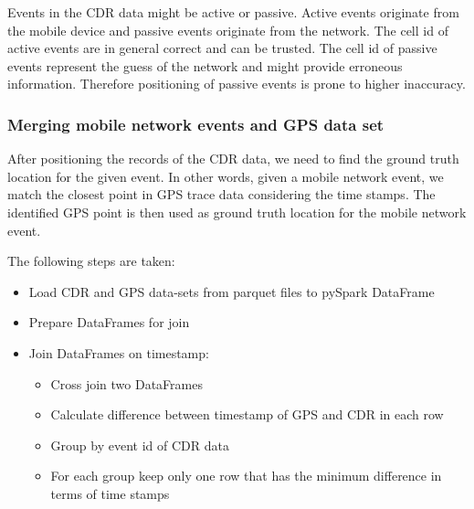 Events in the CDR data might be active or passive. Active events originate from the mobile device and passive events originate from the network. The cell id of active events are in general correct and can be trusted. The cell id of passive events represent the guess of the network and might provide erroneous information. Therefore positioning of passive events is prone to higher inaccuracy. 


\subsubsection{Merging mobile network events and GPS data set}
After positioning the records of the CDR data, we need to find the ground truth location for the given event. In other words, given a mobile network event, we match the closest point in GPS trace data considering the time stamps. The identified GPS point is then used as ground truth location for the mobile network event.

The following steps are taken:
\begin{itemize}
    \item Load CDR and GPS data-sets from parquet files to pySpark DataFrame
    \item Prepare DataFrames for join
    \item Join DataFrames on timestamp:
    \begin{itemize}
        \item Cross join two DataFrames
        \item Calculate difference between timestamp of GPS and CDR in each row
        \item Group by event id of CDR data
        \item For each group keep only one row that has the minimum difference in terms of time stamps
    \end{itemize}
\end{itemize}


